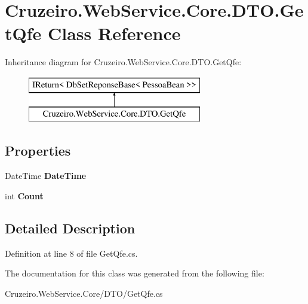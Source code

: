 \hypertarget{class_cruzeiro_1_1_web_service_1_1_core_1_1_d_t_o_1_1_get_qfe}{}\section{Cruzeiro.\+Web\+Service.\+Core.\+D\+T\+O.\+Get\+Qfe Class Reference}
\label{class_cruzeiro_1_1_web_service_1_1_core_1_1_d_t_o_1_1_get_qfe}
Inheritance diagram for Cruzeiro.\+Web\+Service.\+Core.\+D\+T\+O.\+Get\+Qfe\+:\begin{figure}[H]
\begin{center}
\leavevmode
\includegraphics[height=2.000000cm]{class_cruzeiro_1_1_web_service_1_1_core_1_1_d_t_o_1_1_get_qfe}
\end{center}
\end{figure}
\subsection*{Properties}
\begin{DoxyCompactItemize}
\item 
Date\+Time {\bfseries Date\+Time}\hypertarget{class_cruzeiro_1_1_web_service_1_1_core_1_1_d_t_o_1_1_get_qfe_a91a92fd538f76f487c9c46b22c6f0186}{}\label{class_cruzeiro_1_1_web_service_1_1_core_1_1_d_t_o_1_1_get_qfe_a91a92fd538f76f487c9c46b22c6f0186}

\item 
int {\bfseries Count}\hypertarget{class_cruzeiro_1_1_web_service_1_1_core_1_1_d_t_o_1_1_get_qfe_ad7b19bf4e5bff2992a0ad6eacdcbe455}{}\label{class_cruzeiro_1_1_web_service_1_1_core_1_1_d_t_o_1_1_get_qfe_ad7b19bf4e5bff2992a0ad6eacdcbe455}

\end{DoxyCompactItemize}


\subsection{Detailed Description}


Definition at line 8 of file Get\+Qfe.\+cs.



The documentation for this class was generated from the following file\+:\begin{DoxyCompactItemize}
\item 
Cruzeiro.\+Web\+Service.\+Core/\+D\+T\+O/Get\+Qfe.\+cs\end{DoxyCompactItemize}
